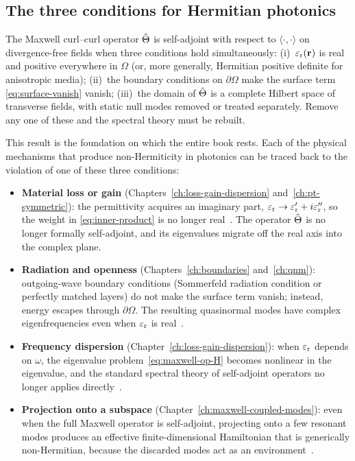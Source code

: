 \subsection{The three conditions for Hermitian photonics}
\label{ssec:three-conditions}

\begin{takeaway}
The Maxwell curl--curl operator $\hat{\Theta}$ is self-adjoint with respect to
$\langle\cdot,\cdot\rangle$ on divergence-free fields when three conditions
hold simultaneously:
(i)~$\varepsilon_{\mathrm{r}}(\mathbf{r})$ is real and positive everywhere in $\Omega$
(or, more generally, Hermitian positive definite for anisotropic media);
(ii)~the boundary conditions on $\partial\Omega$ make the surface term
\eqref{eq:surface-vanish} vanish;
(iii)~the domain of $\hat{\Theta}$ is a complete Hilbert space of transverse
fields, with static null modes removed or treated separately.
Remove any one of these and the spectral theory must be rebuilt.
\end{takeaway}

This result is the foundation on which the entire book rests. Each of the
physical mechanisms that produce non-Hermiticity in photonics can be traced
back to the violation of one of these three conditions:
\begin{itemize}
 \item \textbf{Material loss or gain} (Chapters~\ref{ch:loss-gain-dispersion}
 and~\ref{ch:pt-symmetric}): the permittivity acquires an imaginary part,
 $\varepsilon_{\mathrm{r}} \to \varepsilon_{\mathrm{r}}' + i\varepsilon_{\mathrm{r}}''$, so the weight in
 \eqref{eq:inner-product} is no longer real~\cite{longhi2018parity}. The operator $\hat{\Theta}$ is
 no longer formally self-adjoint, and its eigenvalues migrate off the
 real axis into the complex plane.
 \item \textbf{Radiation and openness} (Chapters~\ref{ch:boundaries}
 and~\ref{ch:qnm}): outgoing-wave boundary conditions (Sommerfeld
 radiation condition or perfectly matched layers) do not make the surface
 term vanish; instead, energy escapes through $\partial\Omega$. The
 resulting quasinormal modes have complex eigenfrequencies even when
 $\varepsilon_{\mathrm{r}}$ is real~\cite{kristensen2011effective,vial2014quasimodal}.
 \item \textbf{Frequency dispersion}
 (Chapter~\ref{ch:loss-gain-dispersion}): when $\varepsilon_{\mathrm{r}}$ depends on
 $\omega$, the eigenvalue problem~\eqref{eq:maxwell-op-H} becomes
 nonlinear in the eigenvalue, and the standard spectral theory of
 self-adjoint operators no longer applies directly~\cite{figotin2004hamiltonian}.
 \item \textbf{Projection onto a subspace}
 (Chapter~\ref{ch:maxwell-coupled-modes}): even when the full Maxwell
 operator is self-adjoint, projecting onto a few resonant modes produces
 an effective finite-dimensional Hamiltonian that is generically
 non-Hermitian, because the discarded modes act as an environment~\cite{alpeggiani2017quasinormal}.
\end{itemize}

